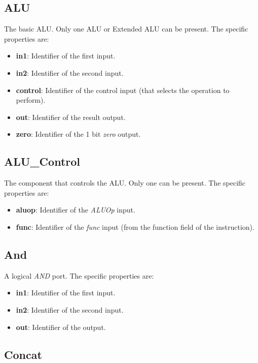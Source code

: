 \documentclass[11pt,a4paper,twoside,titlepage]{report}
\begin{document}
\subsection{ALU}

The basic ALU. Only one ALU or Extended ALU can be present. The specific properties are:
\begin{itemize}
	\item \textbf{in1}: Identifier of the first input.
	\item \textbf{in2}: Identifier of the second input.
	\item \textbf{control}: Identifier of the control input (that selects the operation
		to perform).
	\item \textbf{out}: Identifier of the result output.
	\item \textbf{zero}: Identifier of the 1 bit \emph{zero} output.
\end{itemize}

\subsection{ALU\_Control}

The component that controls the ALU. Only one can be present.
The specific properties are:
\begin{itemize}
	\item \textbf{aluop}: Identifier of the \emph{ALUOp} input.
	\item \textbf{func}: Identifier of the \emph{func} input (from the function field
		of the instruction).
\end{itemize}

\subsection{And}

A logical \emph{AND} port. The specific properties are:
\begin{itemize}
	\item \textbf{in1}: Identifier of the first input.
	\item \textbf{in2}: Identifier of the second input.
	\item \textbf{out}: Identifier of the output.
\end{itemize}

\subsection{Concat}
\end{document}
